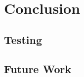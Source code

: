 %
\chapter{Conclusion}
\label{sec:conclusion}



\section{Testing}
\label{sec:conclusion:testing}


\section{Future Work}
\label{sec:conclusion:future}

